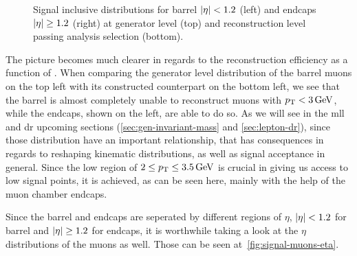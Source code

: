\begin{figure}[!htb]
\caption[Signal \pt distributions split into barrel and endcaps]{ Signal inclusive \pt distributions for barrel $\lvert \eta \rvert < 1.2$ (left) and endcaps $\lvert \eta \rvert \geq 1.2$ (right) at generator level (top) and reconstruction level passing analysis selection (bottom).}
\label{fig:signal-pt-barrel-endcaps}
\end{figure}

The picture becomes much clearer in regards to the reconstruction efficiency as a function of \pt. When comparing the generator level distribution of the barrel muons on the top left with its constructed counterpart on the bottom left, we see that the barrel is almost completely unable to reconstruct muons with $p_{\mathrm{T}} < 3\,\text{Ge\hspace{-.08em}V}$, while the endcaps, shown on the left, are able to do so. As we will see in the \gls{mll} and \gls{dr} upcoming sections (\ref{sec:gen-invariant-mass} and \ref{sec:lepton-dr}), since those distribution have an important relationship, that has consequences in regards to reshaping kinematic distributions, as well as signal acceptance in general. Since the low region of $2 \leq p_{\mathrm{T}} \leq 3.5\,\text{Ge\hspace{-.08em}V}$ is crucial in giving us access to low \dm signal points, it is achieved, as can be seen here, mainly with the help of the muon chamber endcaps.

Since the barrel and endcaps are seperated by different regions of $\eta$, $\lvert \eta \rvert < 1.2$ for barrel and $\lvert \eta \rvert \geq 1.2$ for endcaps, it is worthwhile taking a look at the $\eta$ distributions of the muons as well. Those can be seen at~\ref{fig:signal-muons-eta}.

